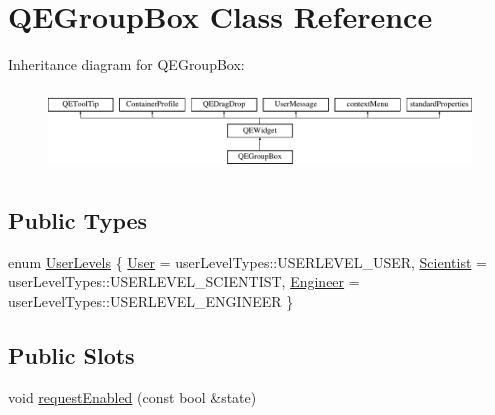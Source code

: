 \hypertarget{classQEGroupBox}{
\section{QEGroupBox Class Reference}
\label{classQEGroupBox}
}
Inheritance diagram for QEGroupBox:\begin{figure}[H]
\begin{center}
\leavevmode
\includegraphics[height=2.204725cm]{classQEGroupBox}
\end{center}
\end{figure}
\subsection*{Public Types}
\begin{DoxyCompactItemize}
\item 
enum \hyperlink{classQEGroupBox_ad5a2c847226aa067c44f86ed42ddaba8}{UserLevels} \{ \hyperlink{classQEGroupBox_ad5a2c847226aa067c44f86ed42ddaba8af266b3d599e59d87c500c8a5e870b4f6}{User} =  userLevelTypes::USERLEVEL\_\-USER, 
\hyperlink{classQEGroupBox_ad5a2c847226aa067c44f86ed42ddaba8a37e2ed84893fe0df0649aad7e32704be}{Scientist} =  userLevelTypes::USERLEVEL\_\-SCIENTIST, 
\hyperlink{classQEGroupBox_ad5a2c847226aa067c44f86ed42ddaba8af3fa6b68de62f134049b7b1f4b7a6310}{Engineer} =  userLevelTypes::USERLEVEL\_\-ENGINEER
 \}
\end{DoxyCompactItemize}
\subsection*{Public Slots}
\begin{DoxyCompactItemize}
\item 
void \hyperlink{classQEGroupBox_a54ec85b75f96e59486c7d1fc2d6b0577}{requestEnabled} (const bool \&state)
\end{DoxyCompactItemize}
